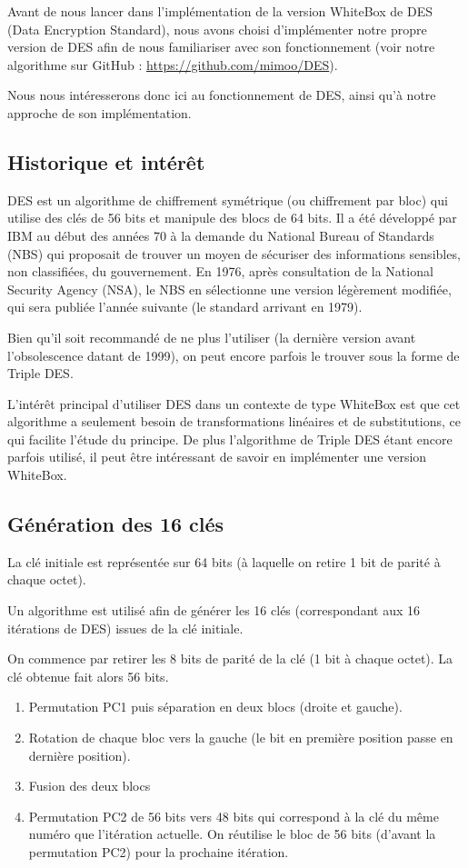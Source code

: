 \documentclass[a4paper,12pt]{article}
\begin{document}
Avant de nous lancer dans l'implémentation de la version WhiteBox de DES (Data Encryption Standard), nous avons choisi d'implémenter notre propre version de DES afin de nous familiariser avec son fonctionnement (voir notre algorithme sur GitHub : \url{https://github.com/mimoo/DES}).
	
Nous nous intéresserons donc ici au fonctionnement de DES, ainsi qu'à notre approche de son implémentation.

\subsection{Historique et intérêt}

DES est un algorithme de chiffrement symétrique (ou chiffrement par bloc) qui utilise des clés de 56 bits et manipule des blocs de 64 bits. Il a été développé par IBM au début des années 70 à la demande du National Bureau of Standards (NBS) qui proposait de trouver un moyen de sécuriser des informations sensibles, non classifiées, du gouvernement. En 1976, après consultation de la National Security Agency (NSA), le NBS en sélectionne une version légèrement modifiée, qui sera publiée l'année suivante (le standard arrivant en 1979).

Bien qu'il soit recommandé de ne plus l'utiliser (la dernière version avant l'obsolescence datant de 1999), on peut encore parfois le trouver sous la forme de Triple DES.
	
L'intérêt principal d'utiliser DES dans un contexte de type WhiteBox est que cet algorithme a seulement besoin de transformations linéaires et de substitutions, ce qui facilite l'étude du principe. De plus l'algorithme de Triple DES étant encore parfois utilisé, il peut être intéressant de savoir en implémenter une version WhiteBox.

\subsection{Génération des 16 clés}	
	
La clé initiale est représentée sur 64 bits (à laquelle on retire 1 bit de parité à chaque octet). 

Un algorithme est utilisé afin de générer les 16 clés (correspondant aux 16 itérations de DES) issues de la clé initiale. 
	
On commence par retirer les 8 bits de parité de la clé (1 bit à chaque octet). La clé obtenue fait alors 56 bits.
\begin{enumerate}
\item Permutation PC1 puis séparation en deux blocs (droite et gauche).
\item Rotation de chaque bloc vers la gauche (le bit en première position passe en dernière position).
\item Fusion des deux blocs
\item Permutation PC2 de 56 bits vers 48 bits qui correspond à la clé du même numéro que l'itération actuelle. On réutilise le bloc de 56 bits (d'avant la permutation PC2) pour la prochaine itération.
\end{enumerate}
\end{document}
